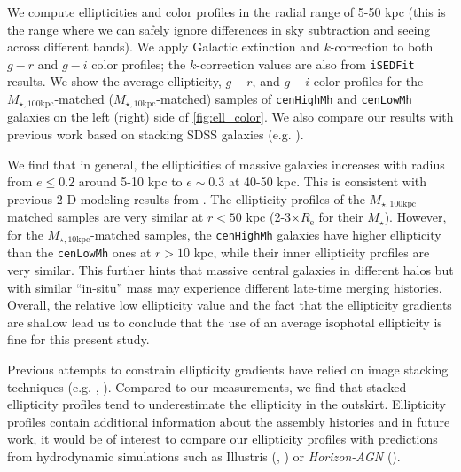 \documentclass[a4paper,fleqn,usenatbib]{mnras}
\def\rbcg{\texttt{cenHighMh}}
\def\nbcg{\texttt{cenLowMh}}
\def\mstar{{$M_{\star}$}}
\def\minn{{$M_{\star,10\mathrm{kpc}}$}}
\def\mtot{{$M_{\star,100\mathrm{kpc}}$}}
\begin{document}
    We compute ellipticities and color profiles in the radial range of 5-50 kpc 
    (this is the range where we can safely ignore differences in sky subtraction and 
    seeing across different bands). 
    We apply Galactic extinction and $k$-correction to both $g-r$ and $g-i$ color 
    profiles; the $k$-correction values are also from \texttt{iSEDFit} results.
    We show the average ellipticity, $g-r$, and $g-i$ color profiles for the 
    \mtot{}-matched (\minn{}-matched) samples of \rbcg{} and \nbcg{} galaxies on the 
    left (right) side of \ref{fig:ell_color}. 
    We also compare our results with previous work based on stacking SDSS galaxies 
    (e.g. \citealt{LaBarbera2010, Tal2011, DSouza2014}).
    
    We find that in general, the ellipticities of massive galaxies increases with 
    radius from $e\le 0.2$ around 5-10 kpc to $e{\sim} 0.3$ at 40-50 kpc. 
    This is consistent with previous 2-D modeling results from \citet{Huang2013a}. 
    The ellipticity profiles of the \mtot{}-matched samples are very similar at 
    $r<50$ kpc (2-3$\times R_{\mathrm{e}}$ for their \mstar{}). 
    However, for the \minn{}-matched samples, the \rbcg{} galaxies have higher 
    ellipticity than the \nbcg{} ones at $r > 10$ kpc, while their inner ellipticity 
    profiles are very similar.  
    This further hints that massive central galaxies in different halos but with 
    similar ``in-situ'' mass may experience different late-time merging histories. 
    Overall, the relative low ellipticity value and the fact that the ellipticity 
    gradients are shallow lead us to conclude that the use of an average 
    isophotal ellipticity is fine for this present study.
            
    Previous attempts to constrain ellipticity gradients have relied on image 
    stacking techniques (e.g. \citealt{Tal2011}, \citealt{DSouza2015}). 
    Compared to our measurements, we find that stacked ellipticity profiles tend to 
    underestimate the ellipticity in the outskirt. 
    Ellipticity profiles contain additional information about the assembly histories 
    and in future work, it would be of interest to compare our ellipticity profiles 
    with predictions from hydrodynamic simulations such as Illustris 
    (\citealt{Vogelsberger2014}, \citealt{Genel2014}) or \textit{Horizon-AGN} 
    (\citealt{Dubois2014}).
    
\end{document}
